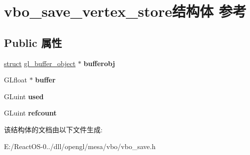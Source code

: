 \hypertarget{structvbo__save__vertex__store}{}\section{vbo\+\_\+save\+\_\+vertex\+\_\+store结构体 参考}
\label{structvbo__save__vertex__store}
\subsection*{Public 属性}
\begin{DoxyCompactItemize}
\item 
\mbox{\label{structvbo__save__vertex__store_a3bb71cf0ea8e8c42da124cb620ce5450}} 
\hyperlink{interfacestruct}{struct} \hyperlink{structgl__buffer__object}{gl\+\_\+buffer\+\_\+object} $\ast$ {\bfseries bufferobj}
\item 
\mbox{\label{structvbo__save__vertex__store_a446a57192630c6889154e758ec4755bf}} 
G\+Lfloat $\ast$ {\bfseries buffer}
\item 
\mbox{\label{structvbo__save__vertex__store_acde744c38fd47f281b8fafb728dde421}} 
G\+Luint {\bfseries used}
\item 
\mbox{\label{structvbo__save__vertex__store_a185065d12784cd13efb0c04ee550c393}} 
G\+Luint {\bfseries refcount}
\end{DoxyCompactItemize}


该结构体的文档由以下文件生成\+:\begin{DoxyCompactItemize}
\item 
E\+:/\+React\+O\+S-\/0../dll/opengl/mesa/vbo/vbo\+\_\+save.\+h\end{DoxyCompactItemize}
